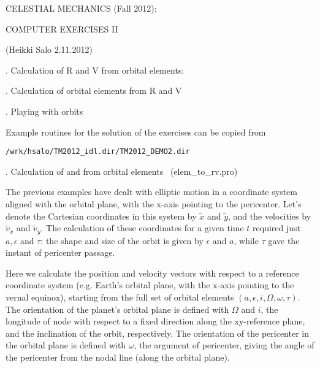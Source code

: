 \documentclass[a4paper,12pt]{article}
\begin{document}
{\centerline{}




{\norm
\vskip 0cm
{{\centerline { {\isob CELESTIAL MECHANICS (Fall 2012): }}}}
\vskip 0.2cm
{{\centerline { {\isob COMPUTER EXERCISES II}}}}

{{\centerline { { (Heikki Salo 2.11.2012)}}}}

\vskip 2cm

{. Calculation of R and V from orbital elements:}

{. Calculation of orbital elements from R and V}

{. Playing with orbits}



\vskip 1cm

Example routines for the solution of the exercises can be copied from

\begin{verbatim}
/wrk/hsalo/TM2012_idl.dir/TM2012_DEMO2.dir
\end{verbatim}



\newpage

\newpage
{. Calculation of \RR and \VV from orbital elements} \ (elem\_to\_rv.pro)

The previous examples have dealt with elliptic motion in a coordinate
system aligned with the orbital plane, with the x-axis pointing to
the pericenter. Let's denote the Cartesian coordinates in this system by
$\tilde x$ and $\tilde y$, and the velocities by $\tilde v_x$ and $\tilde
v_y$. The calculation of these coordinates for a given time $t$ required
just $a, \epsilon$ and $\tau$: the shape and size of the orbit is
given by $\epsilon$ and $a$, while $\tau$ gave the instant of
pericenter passage. 

Here we calculate the position \RR and velocity \VV vectors with
respect to a reference coordinate system (e.g. Earth's orbital plane,
with the x-axis pointing to the vernal equinox), starting from the
full set of orbital elements $(a, \epsilon, i, \Omega, \omega, \tau)$. The
orientation of the planet's orbital plane is defined with $\Omega$ and
$i$, the longitude of node with respect to a fixed direction along the
xy-reference plane, and the inclination of the orbit, respectively.
The orientation of the pericenter in the orbital plane is defined with
$\omega$, the argument of pericenter, giving the angle of the
pericenter from the nodal line (along the orbital plane).


}}
\end{document}
